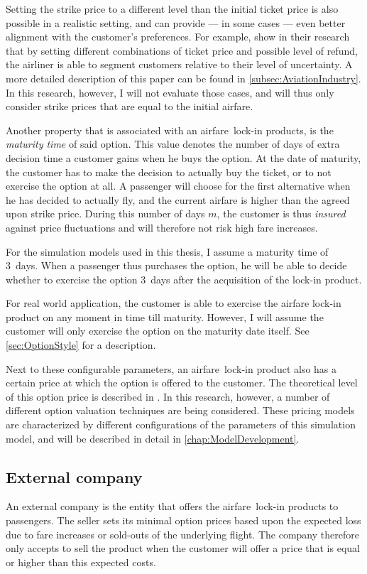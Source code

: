 Setting the strike price to a different level than the initial ticket price is also possible in a realistic setting, and can provide --- in some cases --- even better alignment with the customer's preferences. For example,  show in their research that by setting different combinations of ticket price and possible level of refund, the airliner is able to segment customers relative to their level of uncertainty. A more detailed description of this paper can be found in \autoref{subsec:AviationIndustry}. In this research, however, I will not evaluate those cases, and will thus only consider strike prices that are equal to the initial airfare.


Another property that is associated with an airfare~lock-in products, is the \emph{maturity time} of said option. This value denotes the number of days of extra decision time a customer gains when he buys the option. At the date of maturity, the customer has to make the decision to actually buy the ticket, or to not exercise the option at all. A passenger will choose for the first alternative when he has decided to actually fly, and the current airfare is higher than the agreed upon strike price. During this number of days $m$, the customer is thus \emph{insured} against price fluctuations and will therefore not risk high fare increases.

For the simulation models used in this thesis, I assume a maturity time of 3~days. When a passenger thus purchases the option, he will be able to decide whether to exercise the option 3~days after the acquisition of the lock-in product.

For real world application, the customer is able to exercise the airfare lock-in product on any moment in time till maturity. However, I will assume the customer will only exercise the option on the maturity date itself. See \autoref{sec:OptionStyle} for a description.

Next to these configurable parameters, an airfare~lock-in product also has a certain price at which the option is offered to the customer. The theoretical level of this option price is described in . In this research, however, a number of different option valuation techniques are being considered. These pricing models are characterized by different configurations of the parameters of this simulation model, and will be described in detail in \autoref{chap:ModelDevelopment}.


\subsection{External company}
An external company is the entity that offers the airfare~lock-in products to passengers. The seller sets its minimal option prices based upon the expected loss due to fare increases or sold-outs of the underlying flight. The company therefore only accepts to sell the product when the customer will offer a price that is equal or higher than this expected costs.

